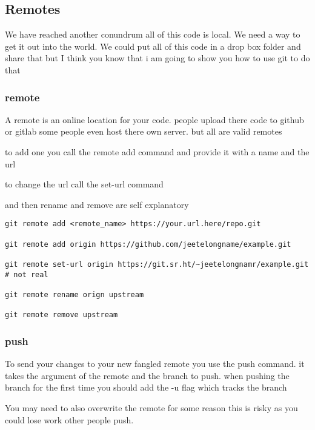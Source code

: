 \documentclass[a4paper]{article}
\begin{document}
\subsection*{Remotes}
\label{sec:org058bd15}
\begin{notes}
We have reached another conundrum all of this code is local. We need a way to
get it out into the world. We could put all of this code in a drop box folder
and share that but I think you know that i am going to show you how to use git
to do that
\end{notes}
\subsubsection*{remote}
\label{sec:orgd460ae6}
\begin{notes}
A remote is an online location for your code. people upload there code to github
or gitlab some people even host there own server. but all are valid remotes

to add one you call the remote add command and provide it with a name and the
url

to change the url call the set-url command

and then rename and remove are self explanatory
\end{notes}

\begin{verbatim}
git remote add <remote_name> https://your.url.here/repo.git

git remote add origin https://github.com/jeetelongname/example.git

git remote set-url origin https://git.sr.ht/~jeetelongnamr/example.git # not real

git remote rename orign upstream

git remote remove upstream
\end{verbatim}

\subsubsection*{push}
\label{sec:org189212c}
\begin{notes}
To send your changes to your new fangled remote you use the push command. it
takes the argument of the remote and the branch to push. when pushing the branch
for the first time you should add the -u flag which tracks the branch

You may need to also overwrite the remote for some reason this is risky as you
could lose work other people push.
\end{notes}
\end{document}
